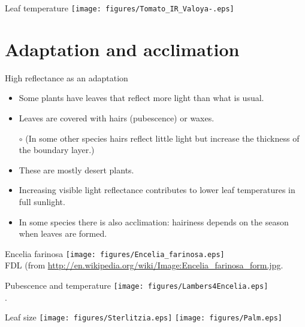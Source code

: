 \documentclass[10pt]{beamer}
\begin{document}
\begin{frame}{Leaf temperature}
    \centering\texttt{[image: figures/Tomato\_IR\_Valoya-.eps]}
\end{frame}

\section{Adaptation and acclimation}

\begin{frame}{High reflectance as an adaptation}
    \begin{itemize}
        \item Some plants have leaves that reflect more light than
        what is usual.
        \item Leaves are covered with hairs (pubescence) or waxes.
        \item[$\circ$] (In some other species hairs reflect little light
        but increase the thickness of the boundary layer.)
        \item These are mostly desert plants.
        \item Increasing visible light reflectance contributes to
        lower leaf temperatures in full sunlight.
        \item In some species there is also acclimation: hairiness
        depends on the season when leaves are formed.
    \end{itemize}
\end{frame}

\begin{frame}{Encelia farinosa}
    \centering\texttt{[image: figures/Encelia\_farinosa.eps]}\\
    {\tiny FDL (from \url{http://en.wikipedia.org/wiki/Image:Encelia_farinosa_form.jpg}.}
\end{frame}

\begin{frame}{Pubescence and temperature}
    \centering\texttt{[image: figures/Lambers4Encelia.eps]}\\
    {\small \autocite[from][]{LambersEtAl1998}.}
\end{frame}

\begin{frame}{Leaf size}
    \centering\texttt{[image: figures/Sterlitzia.eps]}%
    \texttt{[image: figures/Palm.eps]}\\
\end{frame}
\end{document}
